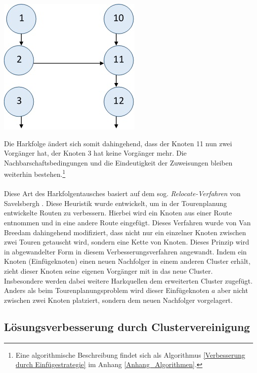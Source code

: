 \documentclass[fontsize=12pt,doubleside,openany,listof=totoc,listof=flat,listof=nochaptergap,numbers=noenddot]{scrbook}
\theoremstyle{style}
\begin{document}
\begin{center}
\begin{minipage}{\textwidth}
\centerline{\includegraphics[angle=0,scale=0.5]{Figures/Laub/Neue_Clusterung.jpg}}
\label{imageNeue_Clusterung}
\end{minipage}
\end{center}

\noindent Die Harkfolge ändert sich somit dahingehend, dass der Knoten 11 nun zwei Vorgänger hat, der Knoten 3 hat keine Vorgänger mehr. Die Nachbarschaftsbedingungen und die Eindeutigkeit der Zuweisungen bleiben weiterhin bestehen.\footnote{Eine algorithmische Beschreibung findet sich als Algorithmus \ref{Verbesserung durch Einfügestrategie} im Anhang \ref{Anhang_Algorithmen}.} \\
\\
Diese Art des Harkfolgentausches basiert auf dem sog. \textit{Relocate-Verfahren} von
Savelsbergh \cite{savelsbergh}. Diese Heuristik wurde entwickelt, um in der Tourenplanung entwickelte Routen zu verbessern. Hierbei wird ein Knoten aus einer Route entnommen und in eine andere Route eingefügt. Dieses Verfahren wurde von 
Van Breedam \cite{breedam} dahingehend modifiziert, dass nicht nur ein einzelner Knoten zwischen zwei Touren getauscht wird, sondern eine Kette von Knoten. 
Dieses Prinzip wird in abgewandelter Form in diesem Verbesserungsverfahren 
angewandt. Indem ein Knoten (\glqq Einfügeknoten\grqq{}) einen neuen Nachfolger in einem anderen Cluster erhält, zieht dieser Knoten seine eigenen Vorgänger mit in das neue Cluster. Insbesondere werden dabei weitere Harkquellen dem erweiterten Cluster zugefügt. Anders als beim Tourenplanungsproblem wird dieser Einfügeknoten $a$ aber nicht zwischen zwei Knoten platziert, sondern dem neuen Nachfolger \glqq vorgelagert\grqq{}.


\subsection{Lösungsverbesserung durch Clustervereinigung}
\label{subsectionClustervereinigung}
\end{document}

